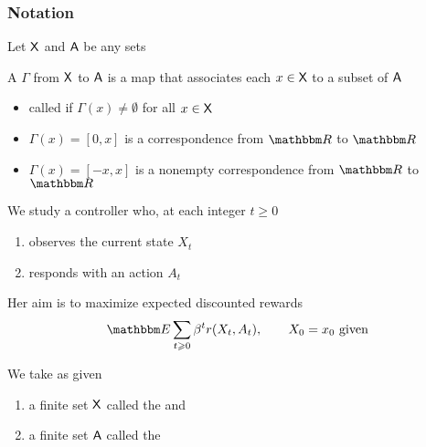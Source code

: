 \begin{frame}
    \frametitle{Notation}

    Let $\mathsf X$ and $\mathsf A$ be any sets
    
    \vspace{0.5em}
    A  $\Gamma$ from $\mathsf X$ to $\mathsf A$
    is a map that associates each $x \in \mathsf X$ to a subset of $\mathsf A$
    
    \vspace{0.5em}
    \begin{itemize}
        \item called  if $\Gamma(x) \not= \emptyset$ for all $x
            \in \mathsf X$
    \end{itemize}
    \vspace{0.5em}
    \vspace{0.5em}

    \Egs

    \begin{itemize}
        \item $\Gamma(x) = [0, x]$ is a correspondence from $\RR$ to $\RR$
    \vspace{0.5em}
        \item $\Gamma(x) = [-x, x]$ is a nonempty correspondence from $\RR$ to $\RR$
    \end{itemize}

\end{frame}



\begin{frame}
    
    \vspace{0.5em}
    We study a controller who, at each integer $t \geq 0$
    \begin{enumerate}
        \item observes the current state $X_t$
    \vspace{0.5em}
        \item responds with an action $A_t$
    \end{enumerate}

    \vspace{0.5em}
    Her aim is to maximize expected discounted
    rewards
    \begin{equation*}\label{eq:dmdp_ob}
        \EE \sum_{t \geq 0} \beta^t r(X_t, A_t),
        \qquad X_0 = x_0 \text{ given}
    \end{equation*}

    \vspace{0.5em}
    We take as given 
    \begin{enumerate}
        \item a finite set $\mathsf X$ called the  and
    \vspace{0.5em}
        \item a finite set $\mathsf A$ called the 
    \end{enumerate}


\end{frame}

